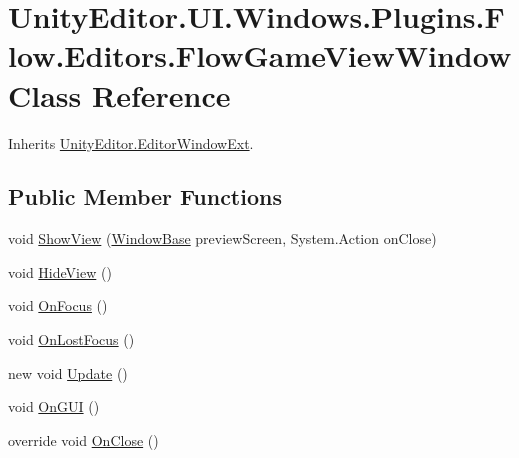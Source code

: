 \hypertarget{class_unity_editor_1_1_u_i_1_1_windows_1_1_plugins_1_1_flow_1_1_editors_1_1_flow_game_view_window}{}\section{Unity\+Editor.\+U\+I.\+Windows.\+Plugins.\+Flow.\+Editors.\+Flow\+Game\+View\+Window Class Reference}
\label{class_unity_editor_1_1_u_i_1_1_windows_1_1_plugins_1_1_flow_1_1_editors_1_1_flow_game_view_window}


Inherits \hyperlink{class_unity_editor_1_1_editor_window_ext}{Unity\+Editor.\+Editor\+Window\+Ext}.

\subsection*{Public Member Functions}
\begin{DoxyCompactItemize}
\item 
void \hyperlink{class_unity_editor_1_1_u_i_1_1_windows_1_1_plugins_1_1_flow_1_1_editors_1_1_flow_game_view_window_a6a858243e72474d3979e9b66de84e2b8}{Show\+View} (\hyperlink{class_unity_engine_1_1_u_i_1_1_windows_1_1_window_base}{Window\+Base} preview\+Screen, System.\+Action on\+Close)
\item 
void \hyperlink{class_unity_editor_1_1_u_i_1_1_windows_1_1_plugins_1_1_flow_1_1_editors_1_1_flow_game_view_window_a9cb920135c798d8535e147265dc47ba6}{Hide\+View} ()
\item 
void \hyperlink{class_unity_editor_1_1_u_i_1_1_windows_1_1_plugins_1_1_flow_1_1_editors_1_1_flow_game_view_window_ac9380c341aac82ae260e62646b99eea8}{On\+Focus} ()
\item 
void \hyperlink{class_unity_editor_1_1_u_i_1_1_windows_1_1_plugins_1_1_flow_1_1_editors_1_1_flow_game_view_window_a62dbc9eacdbbf6708b4da03ac95f8ffb}{On\+Lost\+Focus} ()
\item 
new void \hyperlink{class_unity_editor_1_1_u_i_1_1_windows_1_1_plugins_1_1_flow_1_1_editors_1_1_flow_game_view_window_a56da343f0d7469dc9782ed76fd24c3b8}{Update} ()
\item 
void \hyperlink{class_unity_editor_1_1_u_i_1_1_windows_1_1_plugins_1_1_flow_1_1_editors_1_1_flow_game_view_window_a39266691431cb1f461a748813b306ae0}{On\+G\+U\+I} ()
\item 
override void \hyperlink{class_unity_editor_1_1_u_i_1_1_windows_1_1_plugins_1_1_flow_1_1_editors_1_1_flow_game_view_window_a1181d4dc45f25ccbf3253f40ba783960}{On\+Close} ()
\end{DoxyCompactItemize}

